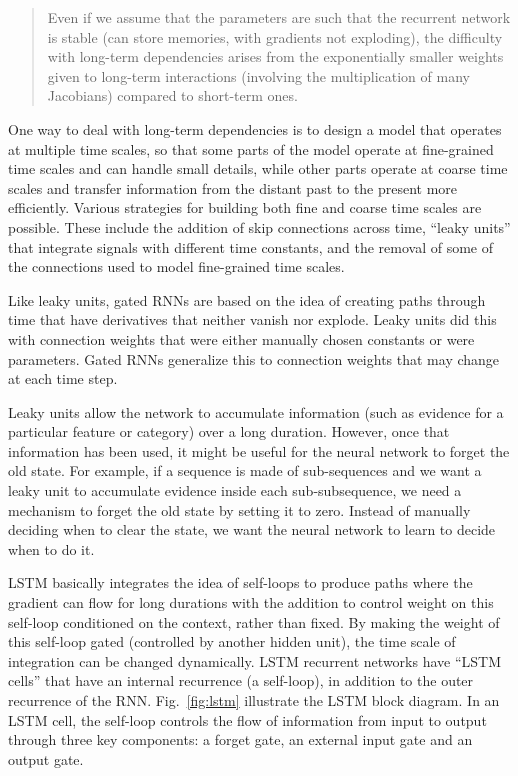 \begin{quote}
  Even if we assume that the parameters are such that the recurrent
  network is stable (can store memories, with gradients not
  exploding), the diﬃculty with long-term dependencies arises from the
  exponentially smaller weights given to long-term interactions
  (involving the multiplication of many Jacobians) compared to
  short-term ones.
\end{quote}

One way to deal with long-term dependencies is to design a model that
operates at multiple time scales, so that some parts of the model
operate at ﬁne-grained time scales and can handle small details, while
other parts operate at coarse time scales and transfer information
from the distant past to the present more eﬃciently. Various
strategies for building both ﬁne and coarse time scales are possible.
These include the addition of skip connections across time, ``leaky
units'' that integrate signals with diﬀerent time constants, and the
removal of some of the connections used to model ﬁne-grained time
scales.

Like leaky units, gated RNNs are based on the idea of creating paths
through time that have derivatives that neither vanish nor explode.
Leaky units did this with connection weights that were either manually
chosen constants or were parameters. Gated RNNs generalize this to
connection weights that may change at each time step.

Leaky units allow the network to accumulate information (such as
evidence for a particular feature or category) over a long duration.
However, once that information has been used, it might be useful for
the neural network to forget the old state. For example, if a sequence
is made of sub-sequences and we want a leaky unit to accumulate
evidence inside each sub-subsequence, we need a mechanism to forget
the old state by setting it to zero. Instead of manually deciding when
to clear the state, we want the neural network to learn to decide when
to do it.

LSTM basically integrates the idea of self-loops to produce paths
where the gradient can ﬂow for long durations with the addition to
control weight on this self-loop conditioned on the context, rather
than ﬁxed. By making the weight of this self-loop gated (controlled by
another hidden unit), the time scale of integration can be changed
dynamically. LSTM recurrent networks have ``LSTM cells'' that have an
internal recurrence (a self-loop), in addition to the outer recurrence
of the RNN. Fig.~\ref{fig:lstm} illustrate the LSTM block diagram. In
an LSTM cell, the self-loop controls the flow of information from
input to output through three key components: a forget gate, an
external input gate and an output gate.

